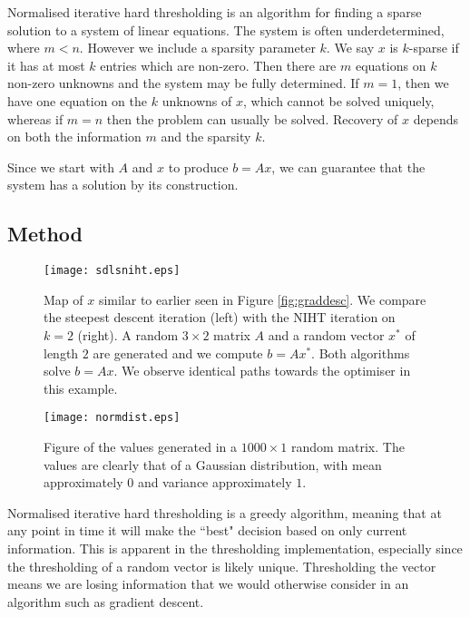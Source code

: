\documentclass{article}
\begin{document}
Normalised iterative hard thresholding is an algorithm for finding a sparse solution to a system of linear equations.
The system is often underdetermined, where $m < n$.
However we include a sparsity parameter $k$.
We say $x$ is $k$-sparse if it has at most $k$ entries which are non-zero.
Then there are $m$ equations on $k$ non-zero unknowns and the system may be fully determined.
If $m=1$, then we have one equation on the $k$ unknowns of $x$, which cannot be solved uniquely,
whereas if $m=n$ then the problem can usually be solved.
Recovery of $x$ depends on both the information $m$ and the sparsity $k$.

Since we start with $A$ and $x$ to produce $b = Ax$, we can guarantee that the system has a solution by its construction.

\subsection{Method}

\begin{figure}
    \centering
    \texttt{[image: sdlsniht.eps]}
    \caption{
        Map of $x$ similar to earlier seen in Figure \ref{fig:graddesc}.
        We compare the steepest descent iteration (left) with the NIHT iteration on $k=2$ (right).
        A random $3 \times 2$ matrix $A$ and a random vector $x^*$ of length $2$ are generated and we compute $b = Ax^*$.
        Both algorithms solve $b=Ax$.
        We observe identical paths towards the optimiser in this example.
    }
    \label{fig:versus}
\end{figure}

\begin{figure}
    \centering
    \texttt{[image: normdist.eps]}
    \caption{
        Figure of the values generated in a $1000\times 1$ random matrix.
        The values are clearly that of a Gaussian distribution,
        with mean approximately $0$ and variance approximately $1$.
    }
    \label{fig:gauss}
\end{figure}

Normalised iterative hard thresholding is a greedy algorithm, meaning that at any point in time it will make the ``best" decision based on only current information.
This is apparent in the thresholding implementation, especially since the thresholding of a random vector is likely unique.
Thresholding the vector means we are losing information that we would otherwise consider in an algorithm such as gradient descent.
\end{document}

